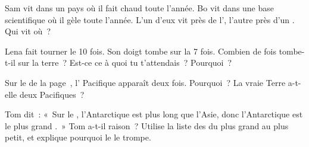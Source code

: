 \begin{exercise}[$\star\star$]\label{exo:g3:continents-and-oceans:7}
Sam vit dans un pays où il fait chaud toute l'année. Bo vit dans une base
scientifique où il gèle toute l'année. L'un d'eux vit près de l',
l'autre près d'un . Qui vit où~?
\end{exercise}

\begin{exercise}[$\star\star$]\label{exo:g3:continents-and-oceans:8}
Lena fait tourner le  10 fois. Son doigt tombe sur la  7 fois.
Combien de fois tombe-t-il sur la terre~? Est-ce ce à quoi tu t'attendais~?
Pourquoi~?
\end{exercise}

\begin{exercise}[$\star\star$]\label{exo:g3:continents-and-oceans:9}
Sur le  de la page~\pageref{fig:g3:continents-and-oceans:world-map},
l' Pacifique apparaît deux fois. Pourquoi~? La vraie Terre a-t-elle
deux  Pacifiques~?
\end{exercise}

\begin{exercise}[$\star\star\star$]\label{exo:g3:continents-and-oceans:10}
Tom dit~: «~Sur le , l'Antarctique est plus long que l'Asie,
donc l'Antarctique est le plus grand .~» Tom a-t-il raison~?
Utilise la liste des  du plus grand au plus petit, et explique
pourquoi le  le trompe.
\end{exercise}
